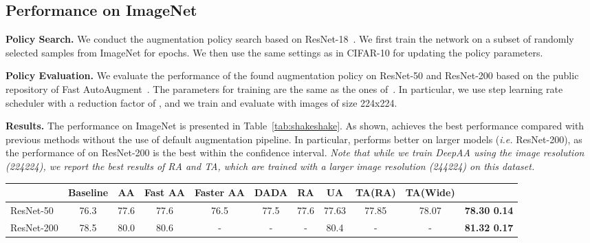 \vspace{-3mm}
\subsection{Performance on ImageNet}

\textbf{Policy Search.} 
We conduct the augmentation policy search based on ResNet-18~\citep{he2016deep}. We first train the network on a subset of  randomly selected samples from ImageNet for  epochs. We then use the same settings as in CIFAR-10 for updating the policy parameters.



\textbf{Policy Evaluation.} 
We evaluate the performance of the found augmentation policy on ResNet-50 and ResNet-200 based on the public repository of Fast AutoAugment~\citep{lim2019fast}. The parameters for training are the same as the ones of~\citep{lim2019fast}. In particular, we use step learning rate scheduler with a reduction factor of , and we train and evaluate with images of size 224x224.





\textbf{Results.}
The performance on ImageNet is presented in Table~\ref{tab:shakeshake}. As shown, \DAA{} achieves the best performance compared with previous methods without the use of default augmentation pipeline. In particular, \DAA{} performs better on larger models (\emph{i.e.} ResNet-200), as the performance of \DAA{} on ResNet-200 is the best within the  confidence interval. \emph{Note that while we train DeepAA using the image resolution (224224), we report the best results of RA and TA, which are trained with a larger image resolution (244224) on this dataset.} 

\addtocounter{footnote}{-1}
\begin{table*}[h]
\centering
\resizebox{1.0\textwidth}{!}
{
\begin{tabular}{@{}l|c|c|c|c|c|c|c|c|c|c@{}}
\toprule
\multicolumn{1}{l}{\textbf{}} & \multicolumn{1}{c}{\textbf{Baseline}} & 
\multicolumn{1}{c}{\textbf{AA}} &
\multicolumn{1}{c}{\textbf{Fast AA}} &
\multicolumn{1}{c}{\textbf{Faster AA}} &
\multicolumn{1}{c}{\textbf{DADA}} &
\multicolumn{1}{c}{\textbf{RA}} &
\multicolumn{1}{c}{\textbf{UA}} &
\multicolumn{1}{c}{\textbf{TA(RA)}\footnotemark} &
\multicolumn{1}{c}{\textbf{TA(Wide)\footnotemark}} &
\multicolumn{1}{c}{\textbf{\DAA{}}}
\\ 
\midrule 
ResNet-50 & 76.3 & 77.6 & 77.6 & 76.5 & 77.5 & 77.6 & 77.63 & 77.85 & 78.07 & \textbf{78.30  0.14} \\
ResNet-200 & 78.5 & 80.0 & 80.6 & - & - & - & 80.4 & - & - & \textbf{81.32  0.17}  \\
\bottomrule
\end{tabular}
}
\caption{{\small Top-1 test accuracy (\%) on ImageNet for ResNet-50 and ResNet-200. The results of \DAA{} are averaged over four independent runs with different initializations. The  confidence interval is denoted by .}}
\label{tab:shakeshake}
\end{table*}



